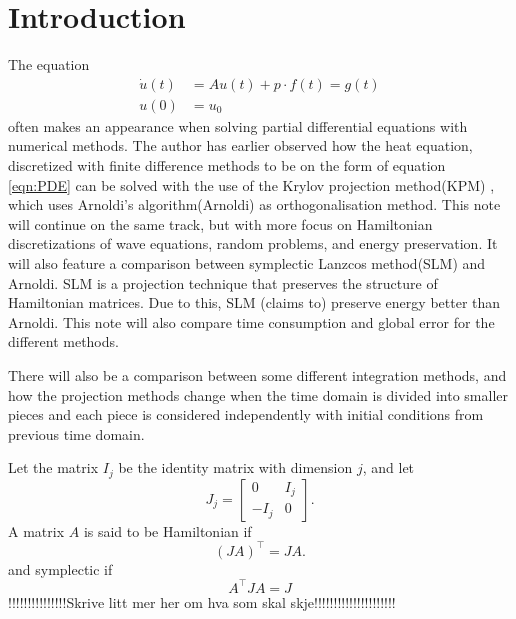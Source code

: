 \chapter{Introduction} %

The equation 
\begin{equation} 
\begin{aligned}
\dot{u}(t) &= A u(t) + p \cdot f(t) = g(t) \\
u(0)&= u_0
\end{aligned}
\label{eqn:PDE}
\end{equation}
often makes an appearance when solving partial differential equations with numerical methods. The author has earlier observed how the heat equation, discretized with finite difference methods to be on the form of equation \eqref{eqn:PDE} can be solved with the use of the Krylov projection method(KPM) \cite{min}, which uses Arnoldi's algorithm(Arnoldi) as orthogonalisation method. This note will continue on the same track, but with more focus on Hamiltonian discretizations of wave equations, random problems, and energy preservation. It will also feature a comparison between symplectic Lanzcos method(SLM) \cite{SLM} and Arnoldi. SLM is a projection technique that preserves the structure of Hamiltonian matrices. Due to this, SLM (claims to) preserve energy better than Arnoldi. This note will also compare time consumption and global error for the different methods.%

There will also be a comparison between some different integration methods, and how the projection methods change when the time domain is divided into smaller pieces and each piece is considered independently with initial conditions from previous time domain.

Let the matrix $I_j$ be the identity matrix with dimension $j$, and let 
\begin{equation}
J_j = 
\begin{bmatrix}
0&I_j\\-I_j&0
\end{bmatrix}.
\end{equation}
A matrix $A$ is said to be Hamiltonian if  \cite{Hamiltonian}
\begin{equation}
(JA)^{\top} = J A. 
\end{equation}
and symplectic if \cite{symplectic}
\begin{equation}
A^\top J A = J
\end{equation}
!!!!!!!!!!!!!!!Skrive litt mer her om hva som skal skje!!!!!!!!!!!!!!!!!!!!!\\


